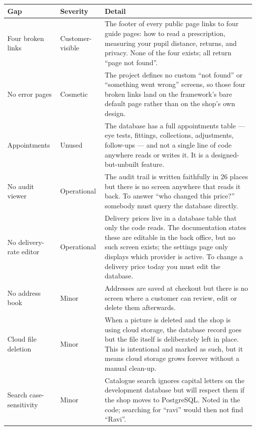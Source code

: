 \documentclass[11pt,a4paper]{report}
\begin{document}
\begin{longtable}{@{}p{}p{}p{}@{}}
\toprule
\textbf{Gap} & \textbf{Severity} & \textbf{Detail}\\
\midrule
\endhead
Four broken links & \textcolor{vcred}{Customer-visible} &
The footer of every public page links to four guide pages: how to read a
prescription, measuring your pupil distance, returns, and privacy. None of the
four exists; all return ``page not found''.\\
\addlinespace
No error pages & \textcolor{vcamber}{Cosmetic} &
The project defines no custom ``not found'' or ``something went wrong''
screens, so those four broken links land on the framework's bare default page
rather than on the shop's own design.\\
\addlinespace
Appointments & \textcolor{vcamber}{Unused} &
The database has a full appointments table --- eye tests, fittings,
collections, adjustments, follow-ups --- and not a single line of code
anywhere reads or writes it. It is a designed-but-unbuilt feature.\\
\addlinespace
No audit viewer & \textcolor{vcamber}{Operational} &
The audit trail is written faithfully in 26 places but there is no screen
anywhere that reads it back. To answer ``who changed this price?'' somebody
must query the database directly.\\
\addlinespace
No delivery-rate editor & \textcolor{vcamber}{Operational} &
Delivery prices live in a database table that only the code reads. The
documentation states these are editable in the back office, but no such screen
exists; the settings page only displays which provider is active. To change a
delivery price today you must edit the database.\\
\addlinespace
No address book & \textcolor{vcgrey}{Minor} &
Addresses are saved at checkout but there is no screen where a customer can
review, edit or delete them afterwards.\\
\addlinespace
Cloud file deletion & \textcolor{vcgrey}{Minor} &
When a picture is deleted and the shop is using cloud storage, the database
record goes but the file itself is deliberately left in place. This is
intentional and marked as such, but it means cloud storage grows forever
without a manual clean-up.\\
\addlinespace
Search case-sensitivity & \textcolor{vcgrey}{Minor} &
Catalogue search ignores capital letters on the development database but will
respect them if the shop moves to PostgreSQL. Noted in the code; searching for
``ravi'' would then not find ``Ravi''.\\
\bottomrule
\end{longtable}
\end{document}
